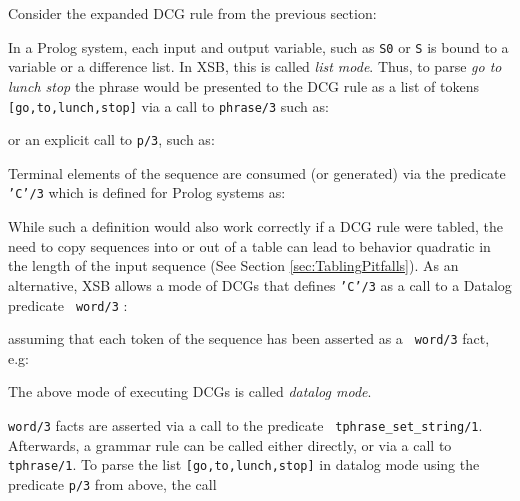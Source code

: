 
Consider the expanded DCG rule from the previous section:


In a Prolog system, each input and output variable, such as {\tt S0}
or {\tt S} is bound to a variable or a difference list.  In XSB, this
is called {\em list mode}.  Thus, to parse {\em go to lunch stop} the
phrase would be presented to the DCG rule as a list of tokens {\tt
[go,to,lunch,stop]} via a call to {\tt phrase/3} such as:


\noindent
or an explicit call to {\tt p/3}, such as:


\noindent
Terminal elements of the sequence are consumed (or generated) via the
predicate {\tt 'C'/3} which is defined for Prolog systems as:


While such a definition would also work correctly if a DCG rule were
tabled, the need to copy sequences into or out of a table can lead to
behavior quadratic in the length of the input sequence (See Section
\ref{sec:TablingPitfalls}).  As an alternative, XSB allows a mode of
DCGs that defines {\tt 'C'/3} as a call to a Datalog predicate {\tt
word/3} :


\noindent
assuming that each token of the sequence has been asserted as a {\tt
word/3} fact, e.g:


\noindent
The above mode of executing DCGs is called {\em datalog mode}.  

{\tt word/3} facts are asserted via a call to the predicate {\tt
tphrase\_set\_string/1}.  Afterwards, a grammar rule can be called
either directly, or via a call to {\tt tphrase/1}.  To parse the list
{\tt [go,to,lunch,stop]} in datalog mode using the predicate {\tt p/3}
from above, the call

